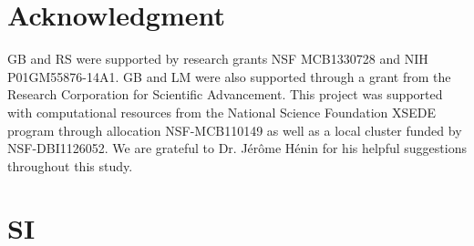 \documentclass[final,3p,times,twocolumn]{elsarticle}
\begin{document}
\section{Acknowledgment}
GB and RS were supported by research grants NSF MCB1330728 and NIH P01GM55876-14A1. GB and LM were also supported through a grant from the Research Corporation for Scientific Advancement. This project was supported with computational resources from the National Science Foundation XSEDE program through allocation NSF-MCB110149 as well as a local cluster funded by NSF-DBI1126052. We are grateful to Dr. J\'{e}r\^{o}me H\'{e}nin for his helpful suggestions throughout this study.  




\nocite{HUMP96,STON1998}

%







\section{SI}
\label{S:SI}

\end{document}
